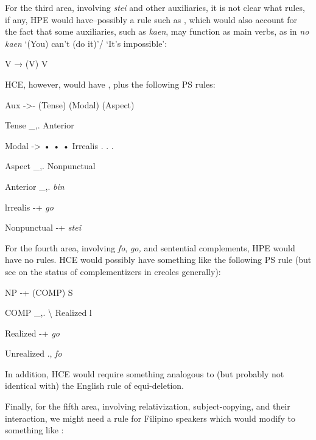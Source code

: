 \ea\label{ex:95}

\glt 
\z

\ea\label{ex:96}

\glt 
\z


For the third area, involving \textit{stei} and other auxiliaries, it is not clear what rules, if any, HPE would have--possibly a rule such as , which would also account for the fact that some auxiliaries, such as \textit{kaen}, may function as main verbs, as in \textit{no kaen} `(You) can't (do it)'/ `It's impossible':

\ea\label{ex:97}
V → (V) V
\z

\noindent HCE, however, would have , plus the following PS rules:

\ea\label{ex:98}
 Aux -{\textgreater}- (Tense) (Modal) (Aspect)
\glt 
\z

\ea\label{ex:99}
 Tense \_,. Anterior
\glt 
\z

\ea\label{ex:100}
 Modal -{\textgreater} • • • Irrealis . . .
\glt 
\z

\ea\label{ex:101}
 Aspect \_,. Nonpunctual
\glt 
\z

\ea\label{ex:102}
 Anterior \_,. \textit{bin}
\glt 
\z

\ea\label{ex:103}
 lrrealis -+ \textit{go}
\glt 
\z

\ea\label{ex:104}
 Nonpunctual -+ \textit{stei}
\glt 
\z


For the fourth area, involving \textit{fo}, \textit{go,} and sentential comple\-ments, HPE would have no rules. HCE would possibly have something like the following PS rule (but see  on the status of complementizers in creoles generally):

\ea\label{ex:105}
NP -+ (COMP) S
\glt 
\z

\ea\label{ex:106}
 COMP \_,. {\textbackslash} Realized l
\glt 
\z

\ea\label{ex:107}
 Realized -+ \textit{go}
\glt 
\z

\ea\label{ex:108}
Unrealized ., \textit{fo}
\glt 
\z

\noindent In addition, HCE would require something analogous to (but probably not identical with) the English rule of equi-deletion.

Finally, for the fifth area, involving relativization, subject-copying, and their interaction, we might need a rule for Filipino speakers which would modify  to something like :

